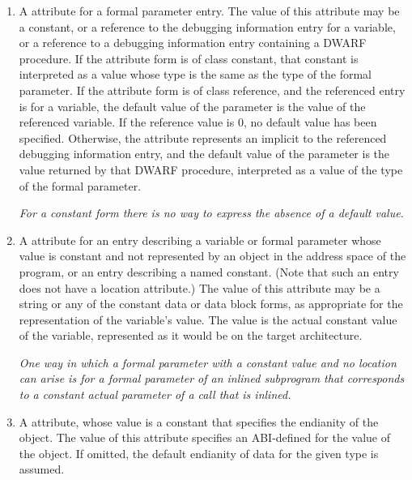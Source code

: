 \begin{enumerate}[1. ]
\item \hypertarget{chap:DWATdefaultvaluedefaultvalueofparameter}{}
A \DWATdefaultvalueDEFN{} attribute
for 
a formal parameter entry. 
The value of this attribute may be a constant, or a reference to the
debugging information entry for a variable, or a reference to a
debugging information entry containing a DWARF procedure.  If the
attribute form is of class constant, that constant is interpreted as
\bb
a value whose type is the same as
\eb
the type of the formal parameter. If the attribute
form is of class reference, and the referenced entry is for a
variable, the default value of the parameter is the value of the
referenced variable.  If the reference value is 0, no default value
has been specified.  Otherwise, the attribute represents an implicit
\DWOPcallref{} to the referenced debugging information entry, and
the default value of the parameter is the value returned by that
DWARF procedure, interpreted as a value of the type of the formal
parameter.

\textit{For a constant form there is no way to 
express the absence of a default value.}

\item \hypertarget{chap:DWATconstvalueconstantobject}{}
A \DWATconstvalueDEFN{} attribute
for an entry describing a
variable or formal parameter whose value is constant and not
represented by an object in the address space of the program,
or an entry describing a named constant. (Note that such
an entry does not have a location attribute.) The value of
this attribute may be a string or any of the constant data
or data block forms, 
as appropriate for the representation
of the variable's value. The value is the actual constant
value of the variable, represented as it would be on the
target architecture.  

\textit{One way in which a formal parameter
with a constant value and no location can arise is for a
formal parameter of an inlined subprogram that corresponds
to a constant actual parameter of a call that is inlined.}

\bbpareb

\item \hypertarget{chap:DWATendianityendianityofdata}{}
A \DWATendianityDEFN{} attribute,
whose value is a constant that 
specifies the endianity of the object. The value of
this attribute specifies an ABI-defined 
  for
the value of the object. If omitted, the default endianity
of data for the given type is assumed.  


\end{enumerate}
